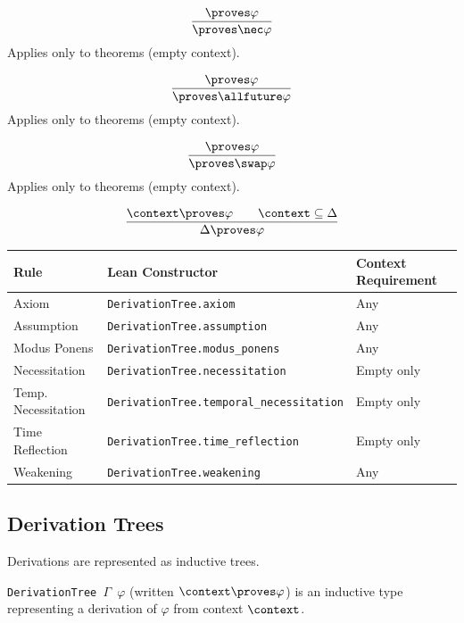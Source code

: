 \documentclass[../BimodalReference.tex]{subfiles}
\begin{document}
\begin{definition}[Necessitation]
\[
\frac{\proves \varphi}{\proves \nec\varphi}
\]
Applies only to theorems (empty context).
\end{definition}

\begin{definition}
\[
\frac{\proves \varphi}{\proves \allfuture\varphi}
\]
Applies only to theorems (empty context).
\end{definition}

\begin{definition}
\[
\frac{\proves \varphi}{\proves \swap\varphi}
\]
Applies only to theorems (empty context).
\end{definition}

\begin{definition}[Weakening]
\[
\frac{\context \proves \varphi \qquad \context \subseteq \Delta}{\Delta \proves \varphi}
\]
\end{definition}

\begin{center}
\begin{tabular}{@{}lll@{}}
\toprule
Rule & Lean Constructor & Context Requirement \\
\midrule
Axiom & \texttt{DerivationTree.axiom} & Any \\
Assumption & \texttt{DerivationTree.assumption} & Any \\
Modus Ponens & \texttt{DerivationTree.modus\_ponens} & Any \\
Necessitation & \texttt{DerivationTree.necessitation} & Empty only \\
Temp. Necessitation & \texttt{DerivationTree.temporal\_necessitation} & Empty only \\
Time Reflection & \texttt{DerivationTree.time\_reflection} & Empty only \\
Weakening & \texttt{DerivationTree.weakening} & Any \\
\bottomrule
\end{tabular}
\end{center}

\subsection{Derivation Trees}

Derivations are represented as inductive trees.

\begin{definition}
\texttt{DerivationTree $\Gamma$ $\varphi$} (written $\context \proves \varphi$) is an inductive type
representing a derivation of $\varphi$ from context $\context$.
\end{definition}
\end{document}
